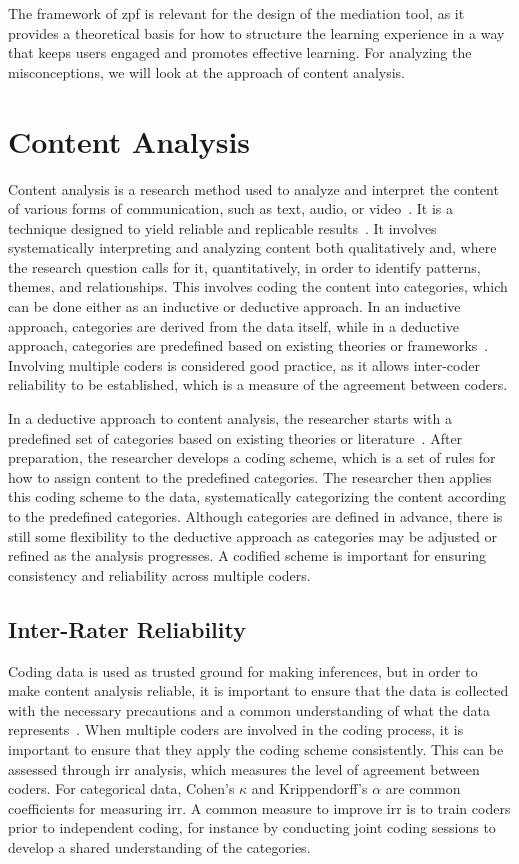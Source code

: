The framework of \gls{zpf} is relevant for the design of the mediation tool, as it provides a theoretical basis for how to structure the learning experience in a way that keeps users engaged and promotes effective learning. For analyzing the misconceptions, we will look at the approach of content analysis.

\section{Content Analysis}
Content analysis is a research method used to analyze and interpret the content of various forms of communication, such as text, audio, or video~\cite{elo_qualitative_2008}. It is a technique designed to yield reliable and replicable results~\cite{krippendorff_content_2004}. It involves systematically interpreting and analyzing content both qualitatively and, where the research question calls for it, quantitatively, in order to identify patterns, themes, and relationships. This involves coding the content into categories, which can be done either as an inductive or deductive approach. In an inductive approach, categories are derived from the data itself, while in a deductive approach, categories are predefined based on existing theories or frameworks~\cite{elo_qualitative_2008}. 
Involving multiple coders is considered good practice, as it allows inter-coder reliability to be established, which is a measure of the agreement between coders.

In a deductive approach to content analysis, the researcher starts with a predefined set of categories based on existing theories or literature~\cite{elo_qualitative_2008}. After preparation, the researcher develops a coding scheme, which is a set of rules for how to assign content to the predefined categories. The researcher then applies this coding scheme to the data, systematically categorizing the content according to the predefined categories. Although categories are defined in advance, there is still some flexibility to the deductive approach as categories may be adjusted or refined as the analysis progresses. A codified scheme is important for ensuring consistency and reliability across multiple coders.

\subsection*{Inter-Rater Reliability}
Coding data is used as trusted ground for making inferences, but in order to make content analysis reliable, it is important to ensure that the data is collected with the necessary precautions and a common understanding of what the data represents~\cite{krippendorff_content_2004}. When multiple coders are involved in the coding process, it is important to ensure that they apply the coding scheme consistently. This can be assessed through \gls{irr} analysis, which measures the level of agreement between coders. For categorical data, Cohen's \(\kappa \) and Krippendorff's \(\alpha \) are common coefficients for measuring \gls{irr}. A common measure to improve \gls{irr} is to train coders prior to independent coding, for instance by conducting joint coding sessions to develop a shared understanding of the categories.

